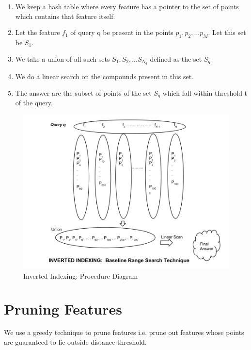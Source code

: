 \begin{enumerate}
	\item We keep a hash table where every feature has a pointer to the set of points which contains that feature itself.
	\item Let the feature $f_1$ of query q be present in the points $p_1,p_2,...p_M$. Let this set be $S_1$.
	\item We take a union of all such sets $S_1, S_2,...S_{N_q}$ defined as the set $S_q$
	\item We do a linear search on the compounds present in this set.
	\item The answer are the subset of points of the set $S_q$ which fall within threshold t of the query.	 
\end{enumerate}


\begin{figure}[ht]	
\centering
\includegraphics[width=1 \columnwidth]{img/image0c.jpg}
\caption{Inverted Indexing: Procedure Diagram}
\label{fig: invert}
\end{figure}




\section{Pruning Features}
 We use a greedy technique to prune features i.e. prune out features whose points are guaranteed to lie outside distance threshold.
 
